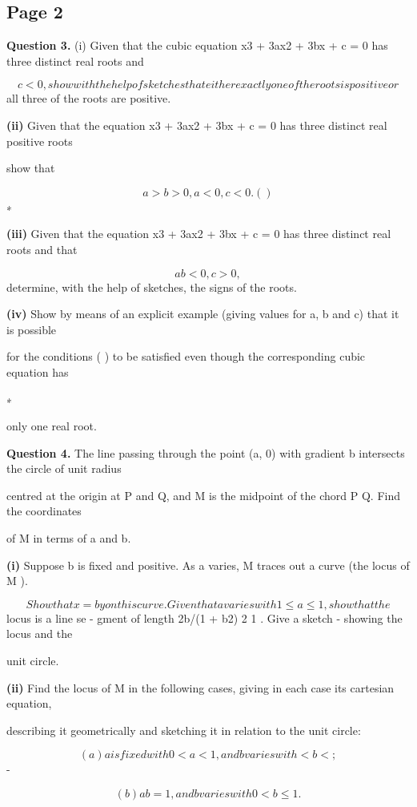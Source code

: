 \documentclass[12pt]{article}
\begin{document}
\subsection*{Page 2}
\begin{flushleft}
\bigskip\textbf{Question 3.} (i) Given that the cubic equation x3 + 3ax2 + 3bx + c = 0 has three distinct real roots and\par
\[c < 0, show with the help of sketches that either exactly one of the roots is positive or\]
all three of the roots are positive.\par
\textbf{(ii)} Given that the equation x3 + 3ax2 + 3bx + c = 0 has three distinct real positive roots\par
show that\par
\[a > b > 0, a < 0, c < 0 . ( )\]
∗\par
[Hint: Consider the turning points.]\par
\textbf{(iii)} Given that the equation x3 + 3ax2 + 3bx + c = 0 has three distinct real roots and that\par
\[ab < 0, c > 0 ,\]
determine, with the help of sketches, the signs of the roots.\par
\textbf{(iv)} Show by means of an explicit example (giving values for a, b and c) that it is possible\par
for the conditions ( ) to be satisfied even though the corresponding cubic equation has\par
∗\par
only one real root.\par
\bigskip\textbf{Question 4.} The line passing through the point (a, 0) with gradient b intersects the circle of unit radius\par
centred at the origin at P and Q, and M is the midpoint of the chord P Q. Find the coordinates\par
of M in terms of a and b.\par
\textbf{(i)} Suppose b is fixed and positive. As a varies, M traces out a curve (the locus of M ).\par
\[Show that x = by on this curve. Given that a varies with 1 \leq a \leq 1, show that the\]
locus is a line se - gment of length 2b/(1 + b2) 2 1 . Give a sketch - showing the locus and the\par
unit circle.\par
\textbf{(ii)} Find the locus of M in the following cases, giving in each case its cartesian equation,\par
describing it geometrically and sketching it in relation to the unit circle:\par
\[(a) a is fixed with 0 < a < 1, and b varies with < b < ;\]
-\infty \infty\par
\[(b) ab = 1, and b varies with 0 < b \leq 1.\]
\end{flushleft}
\end{document}
